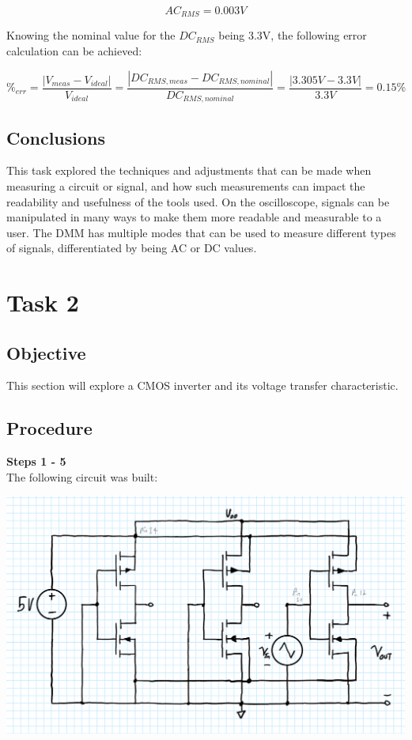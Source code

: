 \documentclass[notitlepage, 12pt]{report}  %
\begin{document}
\begin{equation}
    AC_{RMS} = 0.003V
\end{equation}

\vspace{7pt}

Knowing the nominal value for the $DC_{RMS}$ being 3.3V, the following error calculation can be achieved:

\begin{equation}
    \%_{err} = \frac{|V_{meas} - V_{ideal}|}{V_{ideal}} = \frac{|DC_{RMS,meas} - DC_{RMS,nominal}|}{DC_{RMS,nominal}} = 
    \frac{|3.305V - 3.3V|}{3.3V} = 0.15\%
\end{equation}


\subsection*{Conclusions}

\indent\indent This task explored the techniques and adjustments that can be made when measuring a circuit or signal,
and how such measurements can impact the readability and usefulness of the tools used. On the oscilloscope, 
signals can be manipulated in many ways to make them more readable and measurable to a user. The DMM has
multiple modes that can be used to measure different types of signals, differentiated by being AC or DC 
values.\\



\section*{Task 2}

\subsection*{Objective}
\indent\indent This section will explore a CMOS inverter and its voltage transfer characteristic. 
\subsection*{Procedure}
\textbf{Steps 1 - 5}\\

The following circuit was built:


\begin{center}
    \includegraphics[scale=0.35]{singleInverter.png}
\end{center}
\end{document}
